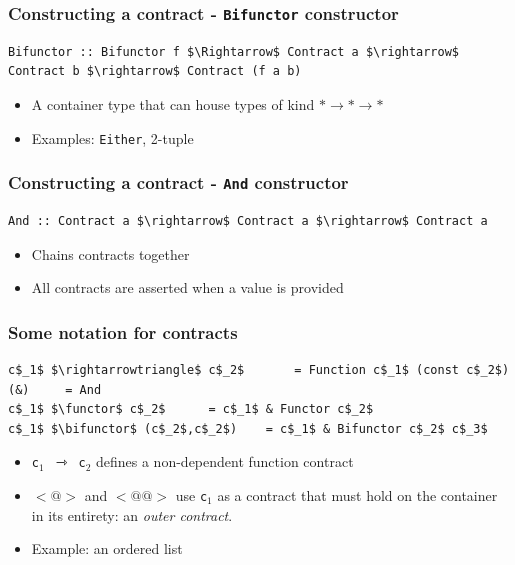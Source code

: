\documentclass[]{beamer}
\makeatletter
\newcommand{\functor}{<\!\!\!@\!\!\!>}
\newcommand{\bifunctor}{<\!\!\!@\!\!@\!\!\!>}
\makeatother
\begin{document}
\begin{frame}[fragile]
\frametitle{Constructing a contract - \texttt{Bifunctor} constructor}

\begin{lstlisting}[mathescape]
Bifunctor :: Bifunctor f $\Rightarrow$ Contract a $\rightarrow$ Contract b $\rightarrow$ Contract (f a b)
\end{lstlisting}

\begin{itemize}
	\item A container type that can house types of kind $* \rightarrow * \rightarrow *$
	\item Examples: \texttt{Either}, 2-tuple
\end{itemize}

\end{frame}

\begin{frame}[fragile]
\frametitle{Constructing a contract - \texttt{And} constructor}

\begin{lstlisting}[mathescape]
And :: Contract a $\rightarrow$ Contract a $\rightarrow$ Contract a
\end{lstlisting}

\begin{itemize}
	\item Chains contracts together
	\item All contracts are asserted when a value is provided
\end{itemize}

\end{frame}

\begin{frame}[fragile]
\frametitle{Some notation for contracts}

\begin{lstlisting}[mathescape]
c$_1$ $\rightarrowtriangle$ c$_2$		= Function c$_1$ (const c$_2$)
(&)		= And
c$_1$ $\functor$ c$_2$		= c$_1$ & Functor c$_2$
c$_1$ $\bifunctor$ (c$_2$,c$_2$)	= c$_1$ & Bifunctor c$_2$ c$_3$
\end{lstlisting}

\begin{itemize}
	\item \texttt{c$_1$ $\rightarrowtriangle$ c$_2$} defines a non-dependent function contract
	\item \texttt{$\functor$} and \texttt{$\bifunctor$} use \texttt{c$_1$} as a contract that must hold on the container in its entirety: an \emph{outer contract}.
	\item Example: an ordered list
\end{itemize}

\end{frame}
\end{document}
